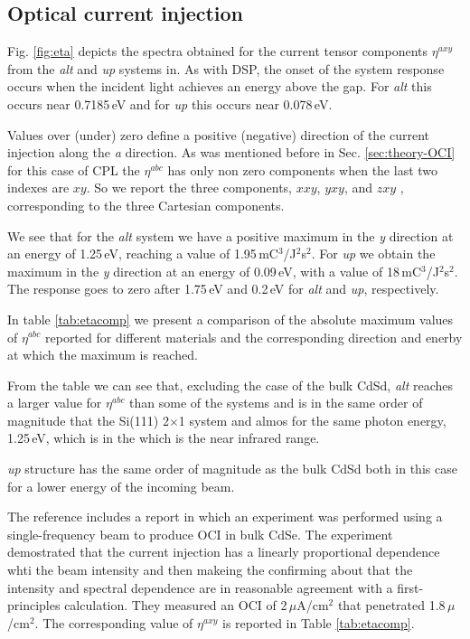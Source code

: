 \documentclass[pss]{wiley2sp} %
\begin{document}
\subsection{Optical current injection}

Fig. \ref{fig:eta} depicts the spectra obtained for the current tensor components $\eta^{axy}$ from the \emph{alt} and \emph{up} systems in. As with DSP, the onset of the system response occurs when the incident light achieves an energy above the gap. For \emph{alt} this occurs near 0.7185\,eV and for \emph{up} this occurs near 0.078\,eV.

Values over (under) zero define a positive (negative) direction of the current injection along the \emph{a} direction. As was mentioned before in Sec. \ref{sec:theory-OCI} for this case of CPL the $\eta^{abc}$ has only non zero components when the last two indexes are $xy$. So we report the three components, $xxy$, $yxy$, and $zxy$ , corresponding to the three Cartesian components.

We see that for the \emph{alt} system we have a positive maximum in the \emph{y} direction at an energy of 1.25\,eV, reaching a value of 1.95\,mC$^{3}$/J$^{2}$s$^{2}$. For \emph{up} we obtain the maximum in the \emph{y} direction at an energy of 0.09\,eV, with a value of 18\,mC$^{3}$/J$^{2}$s$^{2}$. The response goes to zero after 1.75\,eV and 0.2\,eV for \emph{alt} and \emph{up}, respectively.

In table \ref{tab:etacomp} we present a comparison of the absolute maximum values of $\eta^{abc}$ reported for different materials and the corresponding direction and enerby at which the maximum is reached. 

From the table we can see that, excluding the case of the bulk CdSd, \emph{alt} reaches a larger value for $\eta^{abc}$ than some of the systems and is in the same order of magnitude that the Si(111) 2$\times$1 system and almos for the same photon energy, 1.25\,eV, which is in the which is the near infrared range. 

\emph{up} structure has the same order of magnitude as the bulk CdSd both in this case for a lower energy of the incoming beam.\

The reference \cite{lamanAPL99} includes a report in which an experiment was performed using a single-frequency beam to produce OCI in bulk CdSe. The experiment demostrated that the current injection has a  linearly proportional dependence whti the beam intensity and then makeing the confirming about that the intensity and spectral dependence are in reasonable agreement with a first-principles calculation. They measured an OCI of 2\,$\mu$A/cm$^{2}$ that penetrated 1.8\,$\mu$/cm$^{2}$. The corresponding value of $\eta^{axy}$ is reported in Table \ref{tab:etacomp}.
\end{document}
